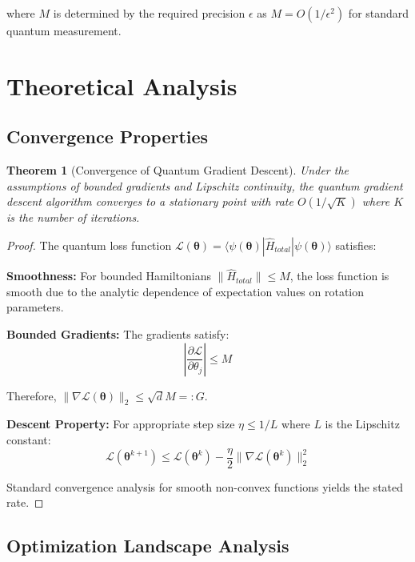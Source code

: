 \documentclass[11pt]{article}
\newtheorem{theorem}{Theorem}[section]
\begin{document}
where $M$ is determined by the required precision $\epsilon$ as $M = O(1/\epsilon^2)$ for standard quantum measurement.

\section{Theoretical Analysis}

\subsection{Convergence Properties}

\begin{theorem}[Convergence of Quantum Gradient Descent]
Under the assumptions of bounded gradients and Lipschitz continuity, the quantum gradient descent algorithm converges to a stationary point with rate $O(1/\sqrt{K})$ where $K$ is the number of iterations.
\end{theorem}

\begin{proof}
The quantum loss function $\mathcal{L}(\bm{\theta}) = \langle \psi(\bm{\theta}) | \hat{H}_{total} | \psi(\bm{\theta}) \rangle$ satisfies:

\textbf{Smoothness:} For bounded Hamiltonians $\|\hat{H}_{total}\| \leq M$, the loss function is smooth due to the analytic dependence of expectation values on rotation parameters.

\textbf{Bounded Gradients:} The gradients satisfy:
\begin{equation}
\left|\frac{\partial \mathcal{L}}{\partial \theta_j}\right| \leq M
\end{equation}

Therefore, $\|\nabla \mathcal{L}(\bm{\theta})\|_2 \leq \sqrt{d} M =: G$.

\textbf{Descent Property:} For appropriate step size $\eta \leq 1/L$ where $L$ is the Lipschitz constant:
\begin{equation}
\mathcal{L}(\bm{\theta}^{k+1}) \leq \mathcal{L}(\bm{\theta}^k) - \frac{\eta}{2}\|\nabla \mathcal{L}(\bm{\theta}^k)\|_2^2
\end{equation}

Standard convergence analysis for smooth non-convex functions yields the stated rate.
\end{proof}

\subsection{Optimization Landscape Analysis}
\end{document}

